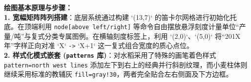 \vspace{0.6cm}

{\small\color{blue!70!black}
\textbf{绘图基本原理与步骤：}\\
\textbf{1. 宽幅矩阵阵列搭建}：底层系统通过构建 `(13,7)` 的笛卡尔网格进行初始化托底。在顶端利用 \texttt{node[above left/right]} 等命令自由摆放悬浮刻度计量单位“产量/吨”与复式分类专属图例。在横轴刻度标签上，利用 `(2,0)`、`(5,0)` 将“201X年”字样正向对准 `X` \texttt{->} `X+1` 这一复式组合宽度的质心点位。\\
\textbf{2. 样式化模式嵌套 (\texttt{patterns} 库)}：对水稻采用了特殊的画笔着色样式 \texttt{pattern=north west lines} 添加左下到右上的经典并行斜剖纹理，而小麦柱体则继续采用标准的教辅灰 \texttt{fill=gray!30}，两者完全贴合左右侧面及下方边框。
}

\newpage
